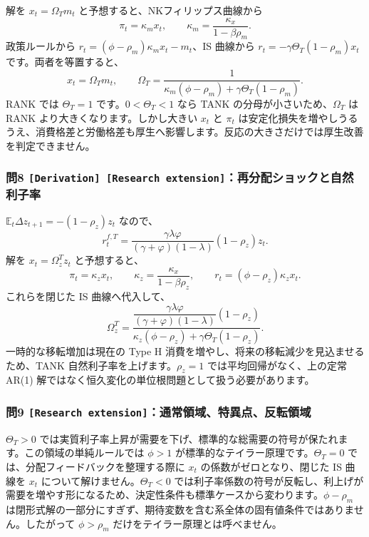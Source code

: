 \documentclass[
  japanese,
  lualatex,
  ja=standard,
  11pt,
  a4paper]{ltjsarticle}
\begin{document}
解を \(x_t=\Omega_Tm_t\) と予想すると、NKフィリップス曲線から \[
\pi_t=\kappa_mx_t,
\qquad
\kappa_m=\frac{\kappa_x}{1-\beta\rho_m}.
\] 政策ルールから \(r_t=(\phi-\rho_m)\kappa_mx_t-m_t\)、IS 曲線から
\(r_t=-\gamma\Theta_T(1-\rho_m)x_t\) です。両者を等置すると、 \[
x_t=\Omega_Tm_t,
\qquad
\Omega_T
=\frac1{\kappa_m(\phi-\rho_m)+\gamma\Theta_T(1-\rho_m)}.
\] RANK では \(\Theta_T=1\) です。\(0<\Theta_T<1\) なら TANK
の分母が小さいため、\(\Omega_T\) は RANK
より大きくなります。しかし大きい \(x_t\) と \(\pi_t\)
は安定化損失を増やしうるうえ、消費格差と労働格差も厚生へ影響します。反応の大きさだけでは厚生改善を判定できません。

\subsubsection{\texorpdfstring{問8
\texttt{{[}Derivation{]}\ {[}Research\ extension{]}}：再分配ショックと自然利子率}{問8 {[}Derivation{]} {[}Research extension{]}：再分配ショックと自然利子率}}\label{ux554f8-derivation-research-extensionux518dux5206ux914dux30b7ux30e7ux30c3ux30afux3068ux81eaux7136ux5229ux5b50ux7387}

\(\mathbb E_t\Delta z_{t+1}=-(1-\rho_z)z_t\) なので、 \[
r_t^{f,T}
=\frac{\gamma\lambda\varphi}
{(\gamma+\varphi)(1-\lambda)}(1-\rho_z)z_t.
\] 解を \(x_t=\Omega_z^Tz_t\) と予想すると、 \[
\pi_t=\kappa_zx_t,
\qquad
\kappa_z=\frac{\kappa_x}{1-\beta\rho_z},
\qquad
r_t=(\phi-\rho_z)\kappa_zx_t.
\] これらを閉じた IS 曲線へ代入して、 \[
\Omega_z^T
=\frac{
\dfrac{\gamma\lambda\varphi}{(\gamma+\varphi)(1-\lambda)}(1-\rho_z)
}{
\kappa_z(\phi-\rho_z)+\gamma\Theta_T(1-\rho_z)
}.
\] 一時的な移転増加は現在の Type H
消費を増やし、将来の移転減少を見込ませるため、TANK
自然利子率を上げます。\(\rho_z=1\) では平均回帰がなく、上の定常 AR(1)
解ではなく恒久変化の単位根問題として扱う必要があります。

\subsubsection{\texorpdfstring{問9
\texttt{{[}Research\ extension{]}}：通常領域、特異点、反転領域}{問9 {[}Research extension{]}：通常領域、特異点、反転領域}}\label{ux554f9-research-extensionux901aux5e38ux9818ux57dfux7279ux7570ux70b9ux53cdux8ee2ux9818ux57df}

\(\Theta_T>0\)
では実質利子率上昇が需要を下げ、標準的な総需要の符号が保たれます。この領域の単純ルールでは
\(\phi>1\) が標準的なテイラー原理です。\(\Theta_T=0\)
では、分配フィードバックを整理する際に \(x_t\)
の係数がゼロとなり、閉じた IS 曲線を \(x_t\)
について解けません。\(\Theta_T<0\)
では利子率係数の符号が反転し、利上げが需要を増やす形になるため、決定性条件も標準ケースから変わります。\(\phi-\rho_m\)
は閉形式解の一部分にすぎず、期待変数を含む系全体の固有値条件ではありません。したがって
\(\phi>\rho_m\) だけをテイラー原理とは呼べません。
\end{document}

